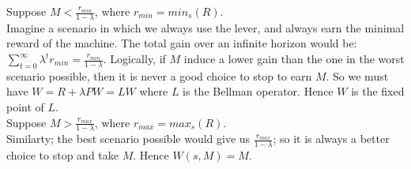 \documentclass[12pt]{article}
\begin{document}
Suppose $M < \tfrac{r_{min}}{1-\lambda}$, where $r_{min} = min_s (R)$. \\
Imagine a scenario in which we always use the lever, and always earn the minimal reward of the machine. The total gain over an infinite horizon would be: $\sum_{t=0}^{\infty} \lambda ^t r_{min}  = \frac{r_{min}}{1-\lambda}$. Logically, if $M$ induce a lower gain than the one in the worst scenario possible, then it is never a good choice to stop to earn $M$. So we must have $W = R + \lambda P W = LW$ where $L $ is the Bellman operator. Hence $W$ is the fixed point of $L$.  \\

Suppose $M > \tfrac{r_{max}}{1-\lambda}$, where $r_{max} = max_s (R)$. \\
Similarty; the best scenario possible would give us $\frac{r_{max}}{1-\lambda}$; so it is always a better choice to stop and take $M$. Hence $W(s,M) = M$.
\end{document}
